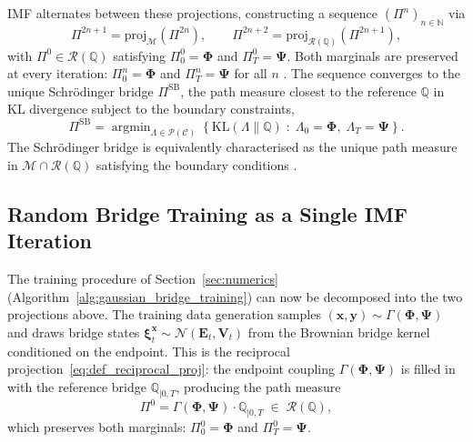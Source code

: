 \documentclass{article}
\newcommand{\Schrodinger}{Schr\"odinger\xspace}
\def\N{\mathbb{N}}
\def\xib{\boldsymbol{\xi}}
\DeclareMathOperator*{\argmin}{argmin}
\theoremstyle{definition}
\begin{document}
IMF \cite[Section~3.2]{shi2023diffusion} alternates between these projections, constructing a sequence $(\Pi^n)_{n \in \N}$ via
\begin{equation}
    \Pi^{2n+1} = \mathrm{proj}_{\mathcal{M}}(\Pi^{2n}), \qquad \Pi^{2n+2} = \mathrm{proj}_{\mathcal{R}(\mathbb{Q})}(\Pi^{2n+1}), \label{eq:imf_iteration}
\end{equation}
with $\Pi^0 \in \mathcal{R}(\mathbb{Q})$ satisfying $\Pi^0_0 = \boldsymbol{\Phi}$ and $\Pi^0_T = \boldsymbol{\Psi}$. Both marginals are preserved at every iteration: $\Pi^n_0 = \boldsymbol{\Phi}$ and $\Pi^n_T = \boldsymbol{\Psi}$ for all $n$ \cite[Theorem~8]{shi2023diffusion}. The sequence converges to the unique \Schrodinger bridge $\Pi^{\mathrm{SB}}$, the path measure closest to the reference $\mathbb{Q}$ in KL divergence subject to the boundary constraints,
\begin{equation}
    \Pi^{\mathrm{SB}} = \argmin_{\Lambda \in \mathcal{P}(\mathcal{C})} \left\{ \mathrm{KL}(\Lambda \| \mathbb{Q}) \;:\; \Lambda_0 = \boldsymbol{\Phi},\; \Lambda_T = \boldsymbol{\Psi} \right\}. \label{eq:sb_problem}
\end{equation}
The \Schrodinger bridge is equivalently characterised as the unique path measure in $\mathcal{M} \cap \mathcal{R}(\mathbb{Q})$ satisfying the boundary conditions \cite{leonard2014survey, shi2023diffusion}.

\subsection{Random Bridge Training as a Single IMF Iteration}

The training procedure of Section~\ref{sec:numerics} (Algorithm~\ref{alg:gaussian_bridge_training}) can now be decomposed into the two projections above. The training data generation samples $(\boldsymbol{x}, \boldsymbol{y}) \sim \Gamma(\boldsymbol{\Phi}, \boldsymbol{\Psi})$ and draws bridge states $\xib_t^{\boldsymbol{x}} \sim \mathcal{N}(\boldsymbol{E}_t, \boldsymbol{V}_t)$ from the Brownian bridge kernel conditioned on the endpoint. This is the reciprocal projection~\eqref{eq:def_reciprocal_proj}: the endpoint coupling $\Gamma(\boldsymbol{\Phi}, \boldsymbol{\Psi})$ is filled in with the reference bridge $\mathbb{Q}_{|0,T}$, producing the path measure
\begin{equation}
    \Pi^0 = \Gamma(\boldsymbol{\Phi}, \boldsymbol{\Psi}) \cdot \mathbb{Q}_{|0,T} \;\in\; \mathcal{R}(\mathbb{Q}), \label{eq:reciprocal_proj}
\end{equation}
which preserves both marginals: $\Pi^0_0 = \boldsymbol{\Phi}$ and $\Pi^0_T = \boldsymbol{\Psi}$.
\end{document}
